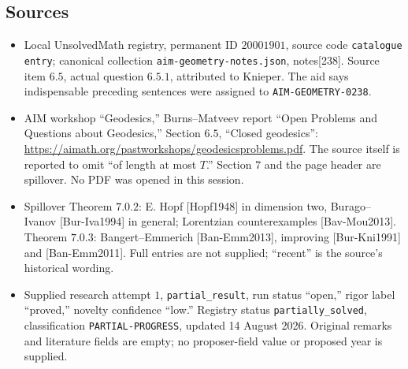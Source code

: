 \documentclass[11pt]{article}
\begin{document}
\subsection{Sources}
\begin{itemize}
\item Local UnsolvedMath registry, permanent ID \(20001901\), source code \texttt{catalogue entry}; canonical collection \texttt{aim-geometry-notes.json}, notes[238]. Source item \(6.5\), actual question \(6.5.1\), attributed to Knieper. The aid says indispensable preceding sentences were assigned to \texttt{AIM-GEOMETRY-0238}.
\item AIM workshop ``Geodesics,'' Burns--Matveev report ``Open Problems and Questions about Geodesics,'' Section \(6.5\), ``Closed geodesics'': \url{https://aimath.org/pastworkshops/geodesicsproblems.pdf}. The source itself is reported to omit ``of length at most \(T\).'' Section \(7\) and the page header are spillover. No PDF was opened in this session.
\item Spillover Theorem \(7.0.2\): E. Hopf [Hopf1948] in dimension two, Burago--Ivanov [Bur-Iva1994] in general; Lorentzian counterexamples [Bav-Mou2013]. Theorem \(7.0.3\): Bangert--Emmerich [Ban-Emm2013], improving [Bur-Kni1991] and [Ban-Emm2011]. Full entries are not supplied; ``recent'' is the source's historical wording.
\item Supplied research attempt \(1\), \texttt{partial\_result}, run status ``open,'' rigor label ``proved,'' novelty confidence ``low.'' Registry status \texttt{partially\_solved}, classification \texttt{PARTIAL-PROGRESS}, updated 14 August 2026. Original remarks and literature fields are empty; no proposer-field value or proposed year is supplied.
\end{itemize}
\end{document}
